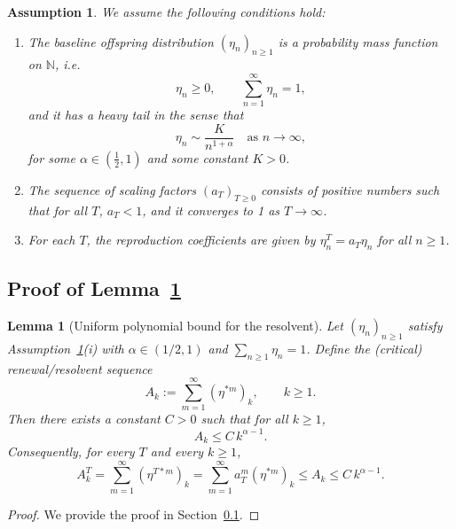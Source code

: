 \documentclass[10pt,a4paper]{amsart}
\newtheorem{assumption}{Assumption}
\newtheorem{lemma}{Lemma}
\begin{document}
\begin{assumption}\label{assumption:1}
We assume the following conditions hold:
\begin{enumerate}
    \item The baseline offspring distribution $(\eta_n)_{n\ge1}$ is a probability mass function on $\mathbb N$, i.e.
    \[
      \eta_n\ge 0,\qquad \sum_{n=1}^\infty \eta_n=1,
    \]
    and it has a heavy tail in the sense that
    \[
      \eta_n \sim \frac{K}{n^{1+\alpha}}\quad \text{as } n\to\infty,
    \]
    for some $\alpha\in\left(\frac12,1\right)$ and some constant $K>0$.

    \item The sequence of scaling factors $(a_T)_{T\ge0}$ consists of positive numbers such that for all $T$, $a_T < 1$, and it converges to 1 as $T \to \infty$.

    \item For each $T$, the reproduction coefficients are given by $\eta_n^T = a_T \eta_n$ for all $n \ge 1$.
\end{enumerate}
\end{assumption}

\subsection{Proof of Lemma~\ref{lem:Ak_uniform_bound}}\label{pf:Ak_uniform_bound}

\begin{lemma}[Uniform polynomial bound for the resolvent]\label{lem:Ak_uniform_bound}
Let $(\eta_n)_{n\ge1}$ satisfy Assumption~\ref{assumption:1}(i) with $\alpha\in(1/2,1)$ and $\sum_{n\ge1}\eta_n=1$.
Define the (critical) renewal/resolvent sequence
\[
A_k:=\sum_{m=1}^{\infty}(\eta^{*m})_k,\qquad k\ge1.
\]
Then there exists a constant $C>0$ such that for all $k\ge1$,
\[
A_k \le C\,k^{\alpha-1}.
\]
Consequently, for every $T$ and every $k\ge1$,
\[
A_k^T=\sum_{m=1}^{\infty}(\eta^{T*m})_k=\sum_{m=1}^{\infty}a_T^m(\eta^{*m})_k\le A_k\le C\,k^{\alpha-1}.
\]
\end{lemma}

\begin{proof}
  We provide the proof in Section~\ref{pf:Ak_uniform_bound}.
\end{proof}
\end{document}
